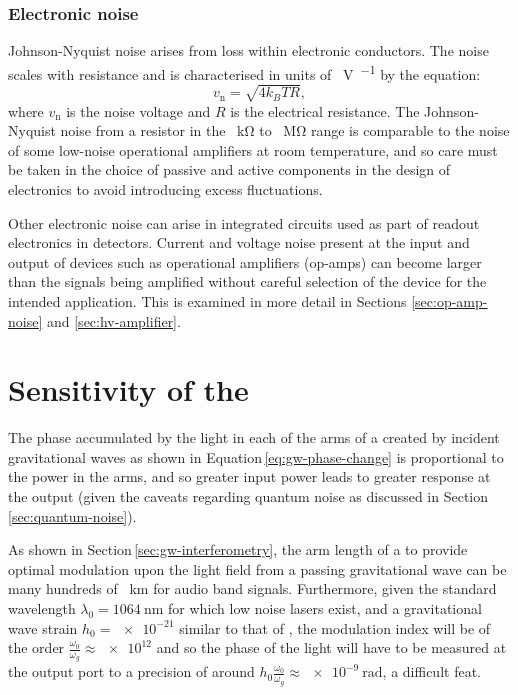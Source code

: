\subsubsection{\label{sec:johnson-nyquist-noise}Electronic noise}
Johnson-Nyquist noise arises from loss within electronic conductors. The noise scales with resistance and is characterised in units of \SI{}{\volt\per\sqrthz} by the equation:
\begin{equation}
  v_{\text{n}} = \sqrt{4 k_B T R},
\end{equation}
where $v_{\text{n}}$ is the noise voltage and $R$ is the electrical resistance. The Johnson-Nyquist noise from a resistor in the \SI{}{\kilo\ohm} to \SI{}{\mega\ohm} range is comparable to the noise of some low-noise operational amplifiers at room temperature, and so care must be taken in the choice of passive and active components in the design of electronics to avoid introducing excess fluctuations.

Other electronic noise can arise in integrated circuits used as part of readout electronics in detectors. Current and voltage noise present at the input and output of devices such as operational amplifiers (op-amps) can become larger than the signals being amplified without careful selection of the device for the intended application. This is examined in more detail in Sections \ref{sec:op-amp-noise} and \ref{sec:hv-amplifier}.

\section{\label{sec:ifo-response}Sensitivity of the \MI{}}
The phase accumulated by the light in each of the arms of a \MI{} created by incident gravitational waves as shown in Equation\,\ref{eq:gw-phase-change} is proportional to the power in the arms, and so greater input power leads to greater response at the output (given the caveats regarding quantum noise as discussed in Section\,\ref{sec:quantum-noise}).

As shown in Section\,\ref{sec:gw-interferometry}, the arm length of a \MI{} to provide optimal modulation upon the light field from a passing gravitational wave can be many hundreds of \SI{}{\kilo\meter} for audio band signals. Furthermore, given the standard wavelength $\lambda_0 = \SI{1064}{\nano\meter}$ for which low noise lasers exist, and a gravitational wave strain $h_0 = \num{e-21}$ similar to that of \GWFIRSTEVENT{}, the modulation index will be of the order $\frac{\omega_0}{\omega_g} \approx \num{e12}$ and so the phase of the light will have to be measured at the output port to a precision of around $h_0 \frac{\omega_0}{\omega_g} \approx \SI{e-9}{\radian}$, a difficult feat.

